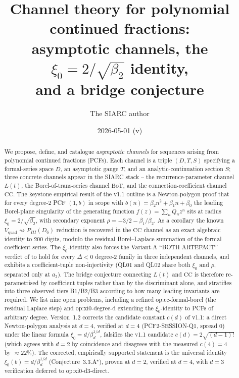 \documentclass[11pt,reqno]{amsart}
\title[Channel theory for polynomial continued fractions]
{Channel theory for polynomial continued fractions:\\
asymptotic channels,
the $\xi_0 = 2/\sqrt{\beta_2}$ identity,\\
and a bridge conjecture}
\author{The SIARC author}
\date{2026-05-01 (v\version)}
\theoremstyle{plain}
\theoremstyle{definition}
\theoremstyle{remark}
\newcommand{\Lt}{L(t)}
\newcommand{\BoT}{\mathrm{BoT}}
\newcommand{\CC}{\mathrm{CC}}
\newcommand{\Vquad}{V_{\mathrm{quad}}}
\begin{document}
\maketitle

\begin{abstract}
We propose, define, and catalogue \emph{asymptotic channels}
for sequences arising from polynomial continued fractions
(PCFs). Each channel is a triple $(D, T, S)$ specifying a
formal-series space $D$, an asymptotic gauge $T$, and an
analytic-continuation section $S$; three concrete channels
appear in the SIARC stack -- the recurrence-parameter channel
$\Lt$, the Borel-of-trans-series channel $\BoT$, and the
connection-coefficient channel $\CC$. The keystone empirical
result of the v1.1 outline is a Newton-polygon proof
\cite{siarc_cc_pipeline_g} that for every degree-$2$ PCF
$(1, b)$ in scope with $b(n) = \beta_2 n^2 + \beta_1 n + \beta_0$
the leading Borel-plane singularity of the generating function
$f(z) = \sum_n Q_n z^n$ sits at radius
$\xi_0 = 2/\sqrt{\beta_2}$, with secondary exponent
$\rho = -3/2 - \beta_1/\beta_2$. As a corollary the known
$\Vquad \rightsquigarrow P_{III}(D_6)$ reduction is recovered
in the $\CC$ channel as an exact algebraic identity to
$200$ digits, modulo the residual Borel--Laplace summation of
the formal coefficient series. The $\xi_0$-identity also
forces the Variant-A ``BOTH ARTEFACT'' verdict of
\cite{siarc_borel_kscan} to hold for every $\Delta<0$
degree-$2$ family in three independent channels, and
exhibits a coefficient-tuple non-injectivity (QL01 and QL02
share both $\xi_0$ and $\rho$, separated only at $a_2$). The
bridge conjecture connecting $\Lt$ and $\CC$ is therefore
re-parametrised by coefficient tuples rather than by the
discriminant alone, and stratifies into three observed tiers
B1/B2/B3 according to how many leading invariants are required.
We list nine open problems, including a refined
\textsf{op:cc-formal-borel} (the residual Laplace step) and
\textsf{op:xi0-degree-d} extending the $\xi_0$-identity to
PCFs of arbitrary degree. Version~1.2 corrects the candidate
constant $c(d)$ of v1.1: a direct Newton-polygon analysis at
$d=4$, verified at $d=4$ (PCF2-SESSION-Q1, spread $0$) under
the linear formula $\xi_0 = d/\beta_d^{1/d}$, falsifies the
v1.1 candidate $c(d) = 2\sqrt{(d-1)!}$ (which agrees with
$d=2$ by coincidence and disagrees with the measured $c(4)=4$
by $\approx 22\%$). The corrected, empirically supported
statement is the universal identity
$\xi_0(b) = d/\beta_d^{1/d}$
(Conjecture~3.3.A$^{\star}$), proven at $d=2$, verified at
$d=4$, with $d=3$ verification deferred to
\textsf{op:xi0-d3-direct}.
\end{abstract}
\end{document}
